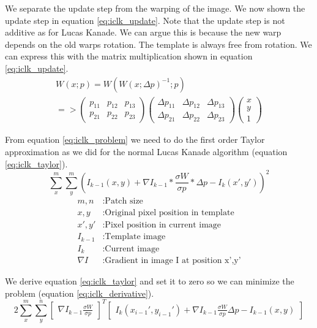 \documentclass[11pt,a4paper,titlepage,oneside]{report}
\begin{document}
We separate the update step from the warping of the image. We now shown the update step in equation \ref{eq:iclk_update}. Note that the update step is not additive as for Lucas Kanade. We can argue this is because the new warp depends on the old warps rotation. The template is always free from rotation. We can express this with the matrix multiplication shown in equation \ref{eq:iclk_update}.
\begin{equation}\label{eq:iclk_update}
  \begin{gathered}
    W(x;p)=W(W(x;\Delta p)^{-1}; p)\\
    =>
    \begin{pmatrix}
    p_{11} & p_{12} & p_{13} \\
    p_{21} & p_{22} & p_{23}
    \end{pmatrix}
    \begin{pmatrix}
      \Delta p_{11} & \Delta p_{12} & \Delta p_{13} \\
      \Delta p_{21} & \Delta p_{22} & \Delta p_{23}
    \end{pmatrix}
    \begin{pmatrix}
      x\\
      y\\
      1
    \end{pmatrix}
  \end{gathered}
\end{equation}

From equation \ref{eq:iclk_problem} we need to do the first order Taylor approximation as we did for the normal Lucas Kanade algorithm (equation \ref{eq:iclk_taylor}).
\begin{equation}\label{eq:iclk_taylor}
  \sum_x^m\sum_y^m(I_{k-1}(x,y)+\nabla I_{k-1}*\frac{\sigma W}{\sigma p}*\Delta p-I_{k}(x',y'))^2
\end{equation}
\begin{align*}
	m,n				 &: \text{Patch size}\\
  x,y        &: \text{Original pixel position in template}\\
  x',y'      &: \text{Pixel position in current image}\\
  I_{k-1}    &: \text{Template image}\\
  I_{k}      &: \text{Current image}\\
  \nabla I  &:  \text{Gradient in image I at position x',y'}
\end{align*}

We derive equation \ref{eq:iclk_taylor} and set it to zero so we can minimize the problem (equation \ref{eq:iclk_derivative}).
\begin{equation}\label{eq:iclk_derivative}
  2\sum_x^m\sum_y^n\begin{bmatrix}\nabla I_{k-1}\frac{\sigma W}{\sigma p}\end{bmatrix}^T\begin{bmatrix}I_{k}(x_{i-1}',y_{i-1}')+\nabla I_{k-1}\frac{\sigma W}{\sigma p}\Delta p-I_{k-1}(x,y)\end{bmatrix}
\end{equation}
\end{document}
